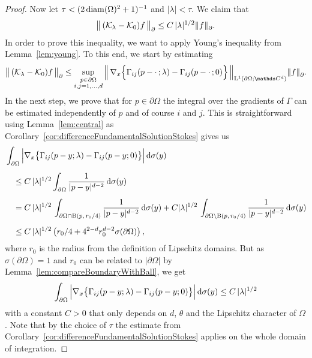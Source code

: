 \begin{proof}
  Now let $\tau < (2 \operatorname{diam}(\Omega)^2 + 1)^{-1}$ and $|\lambda| < \tau$.
  We claim that
  \begin{align*}
  \big\|\, (\mathcal{K}_\lambda - \mathcal{K}_0) f\, \big\|^{}_\partial \leq C \, |\lambda|^{1/2} \|f\|^{}_\partial.
  \end{align*}
  In order to prove this inequality, we want to apply Young's inequality from Lemma~\ref{lem:young}. To this end, we start by estimating
  \begin{align*}
      \big\|\,  (\K_\lambda - \K_0) f\, \big\|^{}_\partial 
    \leq \sup_{\substack {p \in \partial\Omega \\ i,j = 1,\dots,d}} \Big\|\, \nabla_x \Big\{ \Gamma_{ij}(p - \cdot\,; \lambda) - \Gamma_{ij}(p - \cdot\,; 0) \Big\} \, \Big\|_{\Ell^1(\partial\Omega;\C^d)} \| f\|_\partial^{}.
  \end{align*}
  In the next step, we prove that for $p \in \partial\Omega$ the integral over the gradients of $\Gamma$ can be estimated independently of $p$ and of course $i$ and $j$.
  This is straightforward using Lemma~\ref{lem:central} as Corollary~\ref{cor:differenceFundamentalSolutionStokes} gives us
  \begin{align*}
    &\int_{\partial\Omega} \Big| \nabla_x \big\{ \Gamma_{ij}(p - y; \lambda) - \Gamma_{ij}(p - y; 0) \big\} \Big| \, {\operatorname{d}\!{\sigma}}(y)\\[0.5em]
      &\quad\leq C \, |\lambda|^{1/2} \int_{\partial\Omega} \frac{1}{|p - y|^{d - 2}} \, {\operatorname{d}\!{\sigma}}(y) \\[0.5em]
      &\quad= C \, |\lambda|^{1/2} \, \int_{\partial\Omega \cap \mathrm{B}(p,\, r_0/4)} \frac{1}{|p - y|^{d - 2}} \, {\operatorname{d}\!{\sigma}}(y) + C |\lambda|^{1/2}\, \int_{\partial\Omega \setminus \mathrm{B}(p,\, r_0/4)} \frac{1}{|p - y|^{d - 2}} \, {\operatorname{d}\!{\sigma}}(y) \\[0.5em]
      &\quad\leq C \, |\lambda|^{1/2} \,\big( r_0/4 + 4^{2 - d} r_0^{d - 2} \sigma( \partial\Omega ) \big)\,,
  \end{align*}
  where $r_0$ is the radius from the definition of Lipschitz domains.
  But as $\sigma( \partial\Omega )  = 1$ and $r_0$ can be related to $|\partial\Omega|$ by Lemma~\ref{lem:compareBoundaryWithBall}, we get
  \begin{align*}
    \int_{\partial\Omega} \Big|\nabla_x \big\{\Gamma_{ij}(p - y; \lambda) - \Gamma_{ij}(p - y; 0) \big\} \Big| \, {\operatorname{d}\!{\sigma}}(y) \leq C \, |\lambda|^{1/2}
  \end{align*}
  with a constant $C > 0$ that only depends on $d$, $\theta$ and the Lipschitz character of $\Omega$.
  Note that by the choice of $\tau$ the estimate from Corollary~\ref{cor:differenceFundamentalSolutionStokes} applies on the whole domain of integration.


\end{proof}
